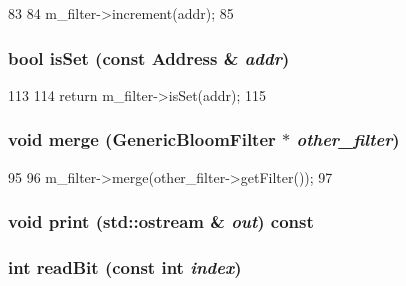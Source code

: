 \begin{DoxyCode}
83 {
84     m_filter->increment(addr);
85 }
\end{DoxyCode}
\hypertarget{classGenericBloomFilter_a4200ee289c3d941a4b209c4788f8087c}{
\subsubsection[{isSet}]{\setlength{\rightskip}{0pt plus 5cm}bool isSet (const {\bf Address} \& {\em addr})}}
\label{classGenericBloomFilter_a4200ee289c3d941a4b209c4788f8087c}



\begin{DoxyCode}
113 {
114     return m_filter->isSet(addr);
115 }
\end{DoxyCode}
\hypertarget{classGenericBloomFilter_a59f97f07ec5f7606df733144207567b6}{
\subsubsection[{merge}]{\setlength{\rightskip}{0pt plus 5cm}void merge ({\bf GenericBloomFilter} $\ast$ {\em other\_\-filter})}}
\label{classGenericBloomFilter_a59f97f07ec5f7606df733144207567b6}



\begin{DoxyCode}
95 {
96     m_filter->merge(other_filter->getFilter());
97 }
\end{DoxyCode}
\hypertarget{classGenericBloomFilter_ac55fe386a101fbae38c716067c9966a0}{
\subsubsection[{print}]{\setlength{\rightskip}{0pt plus 5cm}void print (std::ostream \& {\em out}) const}}
\label{classGenericBloomFilter_ac55fe386a101fbae38c716067c9966a0}
\hypertarget{classGenericBloomFilter_a6f8a98d0f38a8d122d4cbf87323484eb}{
\subsubsection[{readBit}]{\setlength{\rightskip}{0pt plus 5cm}int readBit (const int {\em index})}}
\label{classGenericBloomFilter_a6f8a98d0f38a8d122d4cbf87323484eb}



